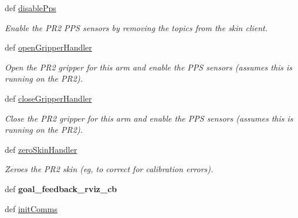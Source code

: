 \begin{DoxyCompactItemize}
def \hyperlink{classhrl__haptic__mpc_1_1mpc__teleop__rviz_1_1_m_p_c_teleop_interactive_markers_a45646c3adaa4a2a95864f785db49a828}{disable\-Pps}
\begin{DoxyCompactList}\small\item\em \-Enable the \-P\-R2 \-P\-P\-S sensors by removing the topics from the skin client. \end{DoxyCompactList}\item 
def \hyperlink{classhrl__haptic__mpc_1_1mpc__teleop__rviz_1_1_m_p_c_teleop_interactive_markers_aba70028755b970dbc6e4138a1e6fc9bf}{open\-Gripper\-Handler}
\begin{DoxyCompactList}\small\item\em \-Open the \-P\-R2 gripper for this arm and enable the \-P\-P\-S sensors (assumes this is running on the \-P\-R2). \end{DoxyCompactList}\item 
def \hyperlink{classhrl__haptic__mpc_1_1mpc__teleop__rviz_1_1_m_p_c_teleop_interactive_markers_a3d4dd07cf9844aab316d43f7ff6c8f1a}{close\-Gripper\-Handler}
\begin{DoxyCompactList}\small\item\em \-Close the \-P\-R2 gripper for this arm and enable the \-P\-P\-S sensors (assumes this is running on the \-P\-R2). \end{DoxyCompactList}\item 
def \hyperlink{classhrl__haptic__mpc_1_1mpc__teleop__rviz_1_1_m_p_c_teleop_interactive_markers_a1fc73e506e387d43937b26d8f4e608ec}{zero\-Skin\-Handler}
\begin{DoxyCompactList}\small\item\em \-Zeroes the \-P\-R2 skin (eg, to correct for calibration errors). \end{DoxyCompactList}\item 
\hypertarget{classhrl__haptic__mpc_1_1mpc__teleop__rviz_1_1_m_p_c_teleop_interactive_markers_abd7465e93eada47a72734f53915862d1}{def {\bfseries goal\-\_\-feedback\-\_\-rviz\-\_\-cb}}\label{classhrl__haptic__mpc_1_1mpc__teleop__rviz_1_1_m_p_c_teleop_interactive_markers_abd7465e93eada47a72734f53915862d1}

\item 
\hypertarget{classhrl__haptic__mpc_1_1mpc__teleop__rviz_1_1_m_p_c_teleop_interactive_markers_a06bcdda5917cf6233d5512eabbc05e4c}{def \hyperlink{classhrl__haptic__mpc_1_1mpc__teleop__rviz_1_1_m_p_c_teleop_interactive_markers_a06bcdda5917cf6233d5512eabbc05e4c}{init\-Comms}}\label{classhrl__haptic__mpc_1_1mpc__teleop__rviz_1_1_m_p_c_teleop_interactive_markers_a06bcdda5917cf6233d5512eabbc05e4c}


\end{DoxyCompactItemize}
